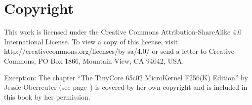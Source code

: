 \chapter{Copyright}

This work is licensed under the Creative Commons Attribution-ShareAlike 4.0 International License. To view a copy of this license, visit http://creativecommons.org/licenses/by-sa/4.0/ or send a letter to Creative Commons, PO Box 1866, Mountain View, CA 94042, USA.

Exception: The chapter ``The TinyCore 65c02 MicroKernel F256(K) Edition'' by Jessie Oberreuter (see page~\pageref{chp:kernel}) is covered by her own copyright and is included in this book by her permission.
